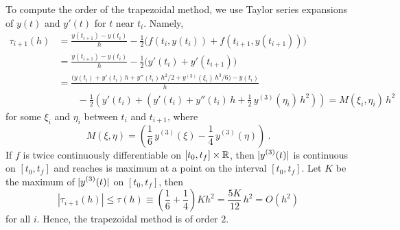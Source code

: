 To compute the order of the trapezoidal method, we use Taylor series
expansions of $y(t)$ and $y'(t)$ for $t$ near $t_i$.  Namely,
\begin{align*}
\tau_{i+1}(h) &= \frac{y(t_{i+1}) - y(t_i)}{h} - \frac{1}{2}\big(
f(t_i,y(t_i)) + f(t_{i+1},y(t_{i+1})) \big) \\
&= \frac{y(t_{i+1}) - y(t_i)}{h} -
\frac{1}{2} \big( y'(t_i) + y'(t_{i+1}) \big) \\
&= \frac{ \big(y(t_i) + y'(t_i)\,h + y''(t_i)\,h^2/2 +
y^{(3)}(\xi_i)\,h^3/6 \big) - y(t_i)}{h} \\
& \qquad -\frac{1}{2} \left( y'(t_i) +
\left(  y'(t_i) + y''(t_i)\,h + \frac{1}{2}\,y^{(3)}(\eta_i)\,h^2
\right) \right)
= M(\xi_i,\eta_i)\, h^2
\end{align*}
for some $\xi_i$ and $\eta_i$ between $t_i$ and $t_{i+1}$, where
\[
  M(\xi,\eta) = \left( \frac{1}{6}\,y^{(3)}(\xi)
-\frac{1}{4}\,y^{(3)}(\eta) \right) \ .
\]
If $f$ is twice continuously differentiable on $[t_0,t_f]\times\mathbb{R}$, then
$\displaystyle |y^{(3)}(t)|$ is continuous on $[t_0,t_f]$ and reaches
is maximum at a point on the interval $[t_0,t_f]$.  Let $K$ be the
maximum of $\displaystyle |y^{(3)}(t)|$ on $[t_0,t_f]$, then
\[
|\tau_{i+1}(h)| \leq \tau(h) \equiv
\left(\frac{1}{6}+\frac{1}{4} \right) K h^2
= \frac{5 K }{12}\, h^2  = O(h^2)
\]
for all $i$.  Hence, the trapezoidal method is of order $2$.

